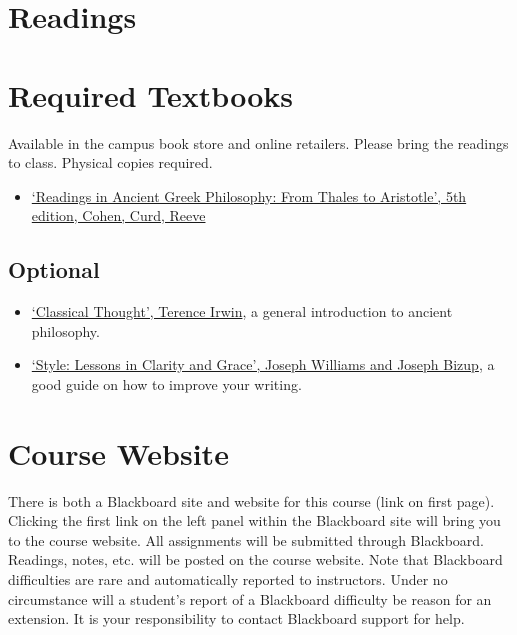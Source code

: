 \documentclass[article,oneside]{memoir}
\begin{document}
\section{Readings}
\section{Required Textbooks}

Available in the campus book store and online retailers. Please bring the readings to class. Physical copies required.
\begin{itemize}
\item \href{https://www.amazon.com/Readings-Ancient-Greek-Philosophy-Aristotle/dp/1624665322/ref=dp_ob_title_bk}{`Readings in Ancient Greek Philosophy: From Thales to Aristotle', 5th edition, Cohen, Curd, Reeve}


\end{itemize}
\subsection{Optional}

\begin{itemize}
\item \href{https://www.amazon.com/Classical-Thought-History-Western-Philosophy/dp/0192891774/ref=sr_1_1?s=books&ie=UTF8&qid=1515009994&sr=1-1&keywords=classical+thought}{`Classical Thought', Terence Irwin}, a general introduction to ancient philosophy.

\item \href{http://www.amazon.com/Style-Lessons-Clarity-Grace-11th/dp/0321898680/ref=sr_1_1?ie=UTF8&qid=1452356026&sr=8-1&keywords=lessons+in+clarity+and+grace}{`Style: Lessons in Clarity and Grace', Joseph Williams and Joseph Bizup}, a good guide on how to improve your writing. 
\end{itemize}
\section{Course Website}
There is both a Blackboard site and website for this course (link on first page). Clicking the first link on the left panel within the Blackboard site will bring you to the course website. All assignments will be submitted through Blackboard. Readings, notes, etc. will be posted on the course website. Note that Blackboard difficulties are rare and automatically reported to instructors. Under no circumstance will a student's report of a Blackboard difficulty be reason for an extension. It is your responsibility to contact Blackboard support for help.
\end{document}
